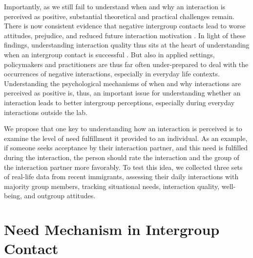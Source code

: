 \documentclass[man, 12pt, a4paper, mask]{apa7}
\theoremstyle{break}
\theoremstyle{plain}
\begin{document}
Importantly, as we still fail to understand when and why an interaction is perceived as positive, substantial theoretical and practical challenges remain. There is now consistent evidence that negative intergroup contacts lead to worse attitudes, prejudice, and reduced future interaction motivation \citep[e.g.,][]{Barlow2012, Prati2021, Graf2014}. In light of these findings, understanding interaction quality thus sits at the heart of understanding when an intergroup contact is successful \citep[e.g.,][]{Allport1954b, Brown2007, Tropp2016}. But also in applied settings, policymakers and practitioners are thus far often under-prepared to deal with the occurrences of negative interactions, especially in everyday life contexts. Understanding the psychological mechanisms of when and why interactions are perceived as positive is, thus, an important issue for understanding whether an interaction leads to better intergroup perceptions, especially during everyday interactions outside the lab.

We propose that one key to understanding how an interaction is perceived is to examine the level of need fulfillment it provided to an individual. As an example, if someone seeks acceptance by their interaction partner, and this need is fulfilled during the interaction, the person should rate the interaction and the group of the interaction partner more favorably. To test this idea, we collected three sets of real-life data from recent immigrants, assessing their daily interactions with majority group members, tracking situational needs, interaction quality, well-being, and outgroup attitudes. 

\section{Need Mechanism in Intergroup Contact}
\end{document}
